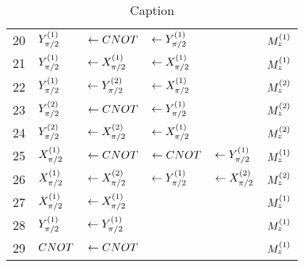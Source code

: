 \begin{appendix}
\begin{table}[htbp]
\begin{tabular}{l | l l l l|r}
            20& $Y_{\pi/2}^{(1)} $&   $\leftarrow CNOT$ & $\leftarrow Y_{\pi/2}^{(1)}$  &&   $M_{z}^{(1)}$ \\  
            21&$Y_{\pi/2}^{(1)} $&   $\leftarrow X_{\pi/2}^{(1)}$ & $\leftarrow X_{\pi/2}^{(1)}$  &&   $M_{z}^{(1)}$ \\ 
            22& $Y_{\pi/2}^{(1)} $&   $\leftarrow Y_{\pi/2}^{(2)}$ & $\leftarrow X_{\pi/2}^{(1)}$  &&   $M_{z}^{(2)}$ \\ 
            23& $Y_{\pi/2}^{(2)} $&   $\leftarrow CNOT$ & $\leftarrow Y_{\pi/2}^{(1)}$  &&   $M_{z}^{(2)}$ \\ 
            24& $Y_{\pi/2}^{(2)} $&   $\leftarrow X_{\pi/2}^{(2)}$ & $\leftarrow X_{\pi/2}^{(1)}$  &&   $M_{z}^{(2)}$ \\
            25&$X_{\pi/2}^{(1)} $&   $\leftarrow CNOT$ & $\leftarrow CNOT$  & $\leftarrow Y_{\pi/2}^{(1)} $&   $M_{z}^{(1)}$ \\ 
            26&$X_{\pi/2}^{(1)} $&   $\leftarrow X_{\pi/2}^{(2)}$ & $\leftarrow Y_{\pi/2}^{(1)}$  & $\leftarrow X_{\pi/2}^{(2)}$&   $M_{z}^{(2)}$ \\  \hline
            27&$X_{\pi/2}^{(1)} $&$\leftarrow X_{\pi/2}^{(1)}$   &&&   $M_{z}^{(1)}$ \\ 
            28& $Y_{\pi/2}^{(1)} $&$\leftarrow Y_{\pi/2}^{(1)}$   &&&   $M_{z}^{(1)}$ \\ 
            29&$CNOT $&$\leftarrow CNOT$   &&&   $M_{z}^{(1)}$ \\ 
             
        \end{tabular}
        \caption{Caption}
        \label{tab:sequences}
    \end{table}

 

\end{appendix}
